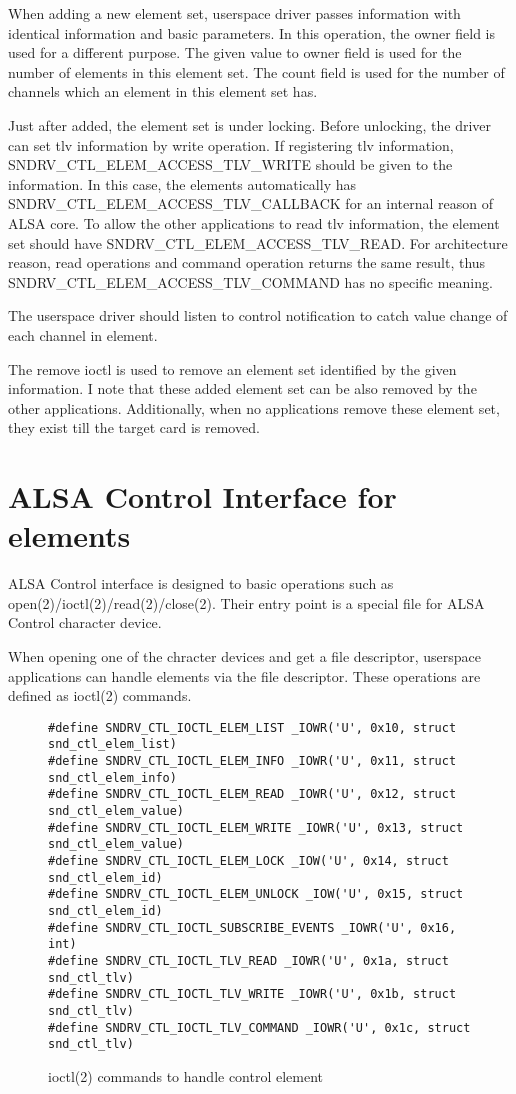 \documentclass[onecolumn]{article}
\begin{document}
When adding a new element set, userspace driver passes information with identical information and basic parameters. In this operation, the owner field is used for a different purpose. The given value to owner field is used for the number of elements in this element set. The count field is used for the number of channels which an element in this element set has.

Just after added, the element set is under locking. Before unlocking, the driver can set tlv information by write operation. If registering tlv information, SNDRV\_CTL\_ELEM\_ACCESS\_TLV\_WRITE should be given to the information. In this case, the elements automatically has SNDRV\_CTL\_ELEM\_ACCESS\_TLV\_CALLBACK for an internal reason of ALSA core. To allow the other applications to read tlv information, the element set should have SNDRV\_CTL\_ELEM\_ACCESS\_TLV\_READ. For architecture reason, read operations and command operation returns the same result, thus SNDRV\_CTL\_ELEM\_ACCESS\_TLV\_COMMAND has no specific meaning.

The userspace driver should listen to control notification to catch value change of each channel in element.

The remove ioctl is used to remove an element set identified by the given information. I note that these added element set can be also removed by the other applications. Additionally, when no applications remove these element set, they exist till the target card is removed.


\section{ALSA Control Interface for elements}

ALSA Control interface is designed to basic operations such as open(2)/ioctl(2)/read(2)/close(2). Their entry point is a special file for ALSA Control character device.

When opening one of the chracter devices and get a file descriptor, userspace applications can handle elements via the file descriptor. These operations are defined as ioctl(2) commands.

\begin{figure}[htbp]
\small
\begin{verbatim}
#define SNDRV_CTL_IOCTL_ELEM_LIST _IOWR('U', 0x10, struct snd_ctl_elem_list)
#define SNDRV_CTL_IOCTL_ELEM_INFO _IOWR('U', 0x11, struct snd_ctl_elem_info)
#define SNDRV_CTL_IOCTL_ELEM_READ _IOWR('U', 0x12, struct snd_ctl_elem_value)
#define SNDRV_CTL_IOCTL_ELEM_WRITE _IOWR('U', 0x13, struct snd_ctl_elem_value)
#define SNDRV_CTL_IOCTL_ELEM_LOCK _IOW('U', 0x14, struct snd_ctl_elem_id)
#define SNDRV_CTL_IOCTL_ELEM_UNLOCK _IOW('U', 0x15, struct snd_ctl_elem_id)
#define SNDRV_CTL_IOCTL_SUBSCRIBE_EVENTS _IOWR('U', 0x16, int)
#define SNDRV_CTL_IOCTL_TLV_READ _IOWR('U', 0x1a, struct snd_ctl_tlv)
#define SNDRV_CTL_IOCTL_TLV_WRITE _IOWR('U', 0x1b, struct snd_ctl_tlv)
#define SNDRV_CTL_IOCTL_TLV_COMMAND _IOWR('U', 0x1c, struct snd_ctl_tlv)
\end{verbatim}
\caption{{ioctl(2) commands to handle control element}}
\label{ioctl-handle-element}
\end{figure}
\end{document}
